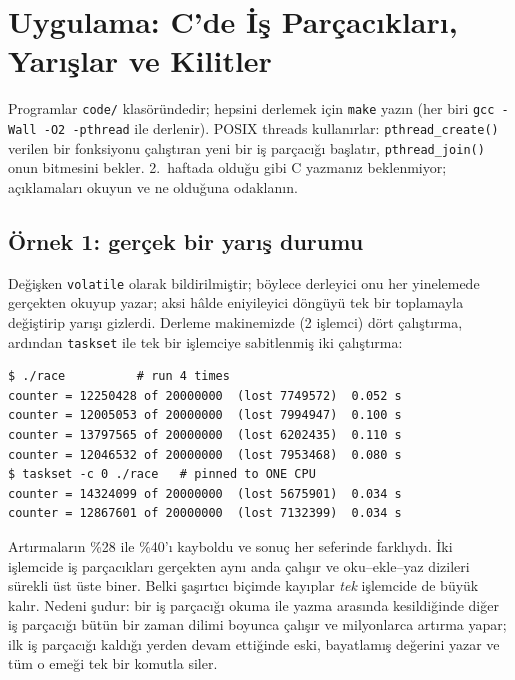\documentclass[11pt,a4paper]{article}
\newcommand{\cmd}[1]{\texttt{#1}}
\begin{document}
\section{Uygulama: C'de İş Parçacıkları, Yarışlar ve Kilitler}

Programlar \texttt{code/} klasöründedir; hepsini derlemek için \cmd{make} yazın (her biri \cmd{gcc -Wall -O2 -pthread} ile derlenir). POSIX threads kullanırlar: \cmd{pthread\_create()} verilen bir fonksiyonu çalıştıran yeni bir iş parçacığı başlatır, \cmd{pthread\_join()} onun bitmesini bekler. 2.~haftada olduğu gibi C yazmanız beklenmiyor; açıklamaları okuyun ve ne olduğuna odaklanın.

\subsection{Örnek 1: gerçek bir yarış durumu}



Değişken \texttt{volatile} olarak bildirilmiştir; böylece derleyici onu her yinelemede gerçekten okuyup yazar; aksi hâlde eniyileyici döngüyü tek bir toplamayla değiştirip yarışı gizlerdi. Derleme makinemizde (2 işlemci) dört çalıştırma, ardından \cmd{taskset} ile tek bir işlemciye sabitlenmiş iki çalıştırma:

\begin{lstlisting}[style=term]
$ ./race          # run 4 times
counter = 12250428 of 20000000  (lost 7749572)  0.052 s
counter = 12005053 of 20000000  (lost 7994947)  0.100 s
counter = 13797565 of 20000000  (lost 6202435)  0.110 s
counter = 12046532 of 20000000  (lost 7953468)  0.080 s
$ taskset -c 0 ./race   # pinned to ONE CPU
counter = 14324099 of 20000000  (lost 5675901)  0.034 s
counter = 12867601 of 20000000  (lost 7132399)  0.034 s
\end{lstlisting}

Artırmaların \%28 ile \%40'ı kayboldu ve sonuç her seferinde farklıydı. İki işlemcide iş parçacıkları gerçekten aynı anda çalışır ve oku--ekle--yaz dizileri sürekli üst üste biner. Belki şaşırtıcı biçimde kayıplar \emph{tek} işlemcide de büyük kalır. Nedeni şudur: bir iş parçacığı okuma ile yazma arasında kesildiğinde diğer iş parçacığı bütün bir zaman dilimi boyunca çalışır ve milyonlarca artırma yapar; ilk iş parçacığı kaldığı yerden devam ettiğinde eski, bayatlamış değerini yazar ve tüm o emeği tek bir komutla siler.
\end{document}
